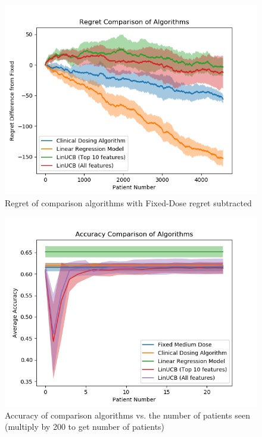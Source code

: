 \documentclass{article}
\begin{document}
\begin{figure}
    \centering
    \includegraphics[width=\columnwidth]{regret}
    \caption{Regret of comparison algorithms with Fixed-Dose regret subtracted}
    \label{fig:regret}
\end{figure}

\begin{figure}
    \centering
    \includegraphics[width=\columnwidth]{accuracy}
    \caption{Accuracy of comparison algorithms  vs. the number of patients seen (multiply by 200 to get number of patients)}
    \label{fig:accuracy}
\end{figure}
\end{document}
